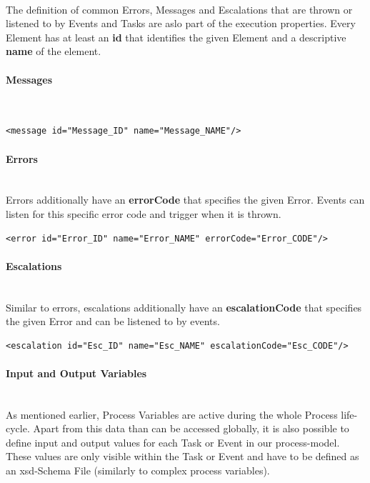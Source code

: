 ~\\The definition of common Errors, Messages and Escalations that are thrown or listened to by Events and Tasks are aslo part of the execution properties. Every Element has at least an \textbf{id} that identifies the given Element and a descriptive \textbf{name} of the element. \cite{bpmnstandard}
\paragraph{Messages}~\\
	\begin{lstlisting}
<message id="Message_ID" name="Message_NAME"/>
	\end{lstlisting}
\paragraph{Errors}~\\
Errors additionally have an \textbf{errorCode} that specifies the given Error. Events can listen for this specific error code and trigger when it is thrown.\\ 
	\begin{lstlisting}
<error id="Error_ID" name="Error_NAME" errorCode="Error_CODE"/>
	\end{lstlisting}
\paragraph{Escalations}~\\
Similar to errors, escalations additionally have an \textbf{escalationCode} that specifies the given Error and can be listened to by events. \\
	\begin{lstlisting}
<escalation id="Esc_ID" name="Esc_NAME" escalationCode="Esc_CODE"/>
\end{lstlisting}

\paragraph{Input and Output Variables}~\\
As mentioned earlier, Process Variables are active during the whole Process life-cycle. Apart from this data than can be accessed globally, it is also possible to define input and output values for each Task or Event in our process-model. These values are only visible within the Task or Event and have to be defined as an \gls{xsd}-Schema File (similarly to complex process variables). \cite{fundamentals}


